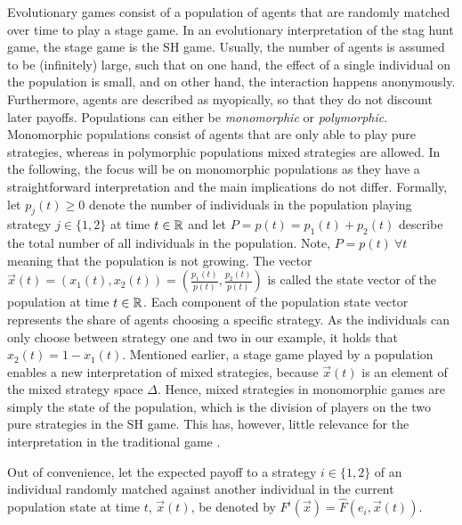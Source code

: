\label{sec:evolutionarystaghunt}
Evolutionary games consist of a population of agents that are randomly matched 
over time to play a stage game. In an evolutionary interpretation of the 
stag hunt game, the stage game is the SH game. 
Usually, the number of agents is assumed to be (infinitely) large, 
such that on one hand, the effect of a single individual 
on the population is small, and on 
other hand, the interaction happens anonymously.
Furthermore, agents are described as myopically, so that they do not 
discount later payoffs.
Populations can either be \textit{monomorphic} or \textit{polymorphic}.
Monomorphic populations consist of agents that are only able to play pure
strategies, whereas in polymorphic populations mixed strategies are allowed.
In the following, the focus will be on monomorphic populations as they have
a straightforward interpretation and the main implications do not differ. 
Formally, let $p_j(t) \geq 0$ denote the number of individuals in 
the population playing strategy $j \in \{1,2\}$ at time $t \in \mathbb{R}$ and 
let $P = p(t) = p_1(t) + p_2(t)$ describe the total number of all individuals 
in the population. Note, $P =p(t)\ \forall t$ meaning that the population 
is not growing. The vector $\vec{x}(t) = \left(x_1(t),x_2(t)\right)
=\left(\frac{p_1(t)}{p(t)},\frac{p_2(t)}{p(t)}\right)$ is called the state 
vector of the population at time $t \in \mathbb{R}$. 
Each component of the population state vector represents the share of agents 
choosing a specific strategy. As the individuals can only choose between 
strategy one and two in our example, it holds that  $x_2(t) = 1-x_1(t)$. 
Mentioned earlier, a stage game played by a population enables a 
new interpretation of mixed strategies, because $\vec{x}(t)$ is an 
element of the mixed strategy space $\Delta$.
Hence, mixed strategies in monomorphic games are simply the state
of the population, which is the division of players on the two
pure strategies in the SH game. 
This has, however, little relevance for the interpretation
in the traditional game \parencite[914-915]{rubinstein_comments_1991}.

Out of convenience, let the expected payoff 
to a strategy $i \in \{1,2\}$ of an individual randomly matched
against another individual in the current population state at time $t$, 
$\vec{x}(t)$, be denoted by $F^i(\vec{x}) = \hat{F}(e_i,\vec{x}(t))$. 

